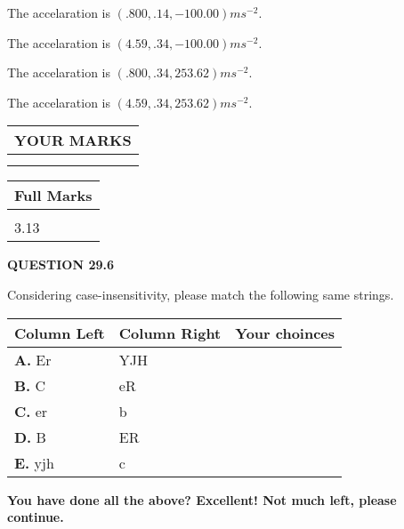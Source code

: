 \documentclass[12pt]{article}
\begin{document}
 
The accelaration is $  %
(
.800,
.14,
-100.00)
ms^{-2} $.
 
 
The accelaration is $  %
(
4.59,
.34,
-100.00)
ms^{-2} $.
 
 
The accelaration is $  %
(
.800,
.34,
253.62)
ms^{-2} $.
 
 
The accelaration is $  %
(
4.59,
.34,
253.62)
ms^{-2} $.
 
 
 

 

 
\vspace{0.3in}
  
\vspace{0.2in}
  
\noindent\begin{tabular}{|l|}
\hline
 YOUR MARKS  \\
\hline
 \\ 
 \\ 
\hline
\end{tabular}
\hspace{0.05in} \begin{tabular}{|l|}
\hline
 Full Marks  \\
\hline
 \\ 
3.13 \\
\hline
\end{tabular}
{\textbf{\Large{QUESTION
29.6 
}}}
  
  
Considering case-insensitivity, please match the following same strings.
  
  
\begin{tabular}{|l|l|l|}
 \hline
 Column Left & Column Right  & Your choinces \\ 
 \hline
{\textbf{\large{
A.}}}
Er
  & 
YJH
 & 
 \\ 
 \hline
{\textbf{\large{
B.}}}
C
  & 
eR
 & 
 \\ 
 \hline
{\textbf{\large{
C.}}}
er
  & 
b
 & 
 \\ 
 \hline
{\textbf{\large{
D.}}}
B
  & 
ER
 & 
 \\ 
 \hline
{\textbf{\large{
E.}}}
yjh
  & 
c
 & 
 \\ 
 \hline
 \end{tabular}
  
  
 
   
   
\vspace{0.3in}
{\textbf{\LARGE{You have done all the above? Excellent! Not much left, please continue.}}}
\vspace{0.3in}
   
\end{document}
